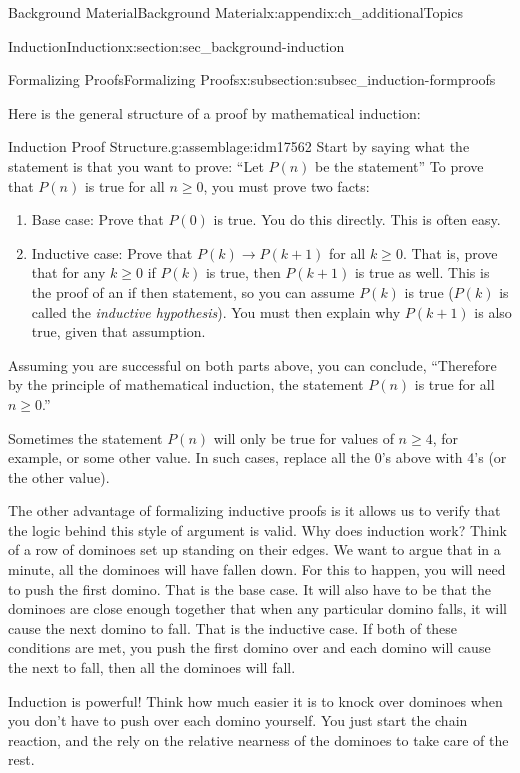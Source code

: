 \documentclass[oneside,10pt,]{book}
\numberwithin{equation}{chapter}
\def\imp{\rightarrow}
\begin{document}
\begin{appendixptx}{Background Material}{}{Background Material}{}{}{x:appendix:ch_additionalTopics}
\begin{sectionptx}{Induction}{}{Induction}{}{}{x:section:sec_background-induction}
\begin{subsectionptx}{Formalizing Proofs}{}{Formalizing Proofs}{}{}{x:subsection:subsec_induction-formproofs}
\par
Here is the general structure of a proof by mathematical induction:%
\begin{assemblage}{Induction Proof Structure.}{g:assemblage:idm17562}%
 Start by saying what the statement is that you want to prove: ``Let \(P(n)\) be the statement\textellipsis{}'' To prove that \(P(n)\) is true for all \(n \ge 0\), you must prove two facts:%
\begin{enumerate}
\item{}Base case: Prove that \(P(0)\) is true. You do this directly. This is often easy.%
\item{}Inductive case: Prove that \(P(k) \imp P(k+1)\) for all \(k \ge 0\). That is, prove that for any \(k \ge 0\) if \(P(k)\) is true, then \(P(k+1)\) is true as well. This is the proof of an if \textellipsis{} then \textellipsis{} statement, so you can assume \(P(k)\) is true (\(P(k)\) is called the \emph{inductive hypothesis}). You must then explain why \(P(k+1)\) is also true, given that assumption.%
\end{enumerate}
%
\par
Assuming you are successful on both parts above, you can conclude, ``Therefore by the principle of mathematical induction, the statement \(P(n)\) is true for all \(n \ge 0\).''%
\end{assemblage}
Sometimes the statement \(P(n)\) will only be true for values of \(n \ge 4\), for example, or some other value. In such cases, replace all the 0's above with 4's (or the other value).%
\par
The other advantage of formalizing inductive proofs is it allows us to verify that the logic behind this style of argument is valid. Why does induction work? Think of a row of dominoes set up standing on their edges. We want to argue that in a minute, all the dominoes will have fallen down. For this to happen, you will need to push the first domino. That is the base case. It will also have to be that the dominoes are close enough together that when any particular domino falls, it will cause the next domino to fall. That is the inductive case. If both of these conditions are met, you push the first domino over and each domino will cause the next to fall, then all the dominoes will fall.%
\par
Induction is powerful! Think how much easier it is to knock over dominoes when you don't have to push over each domino yourself. You just start the chain reaction, and the rely on the relative nearness of the dominoes to take care of the rest.%

\end{subsectionptx}
\end{sectionptx}
\end{appendixptx}
\end{document}
